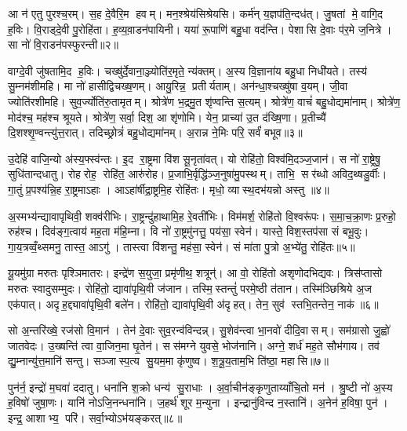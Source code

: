 आ न॑ एतु पुरश्च॒रम्। स॒ह दे॒वैरि॒म हवम्। मन॒श्श्रेय॑सिश्रेयसि। कर्म॑न् य॒ज्ञप॑ति॒न्दध॑त्। जु॒षतां मे॒ वागि॒द ह॒विः। वि॒राड्दे॒वी पु॒रोहि॑ता। ह॒व्य॒वा़डन॑पायिनी। यया॑ रू॒पाणि॑ बहु॒धा वद॑न्ति। पेशासि दे॒वाः प॑र॒मे ज॒नित्रे। सा नो॑ वि॒राडन॑पस्फुरन्ती॥२॥

वाग्दे॒वी जु॑षतामि॒द ह॒विः। चख्षु॑र्दे॒वाना॒ञ्ज्योति॑र॒मृते॒ न्य॑क्तम्। अ॒स्य वि॒ज्ञाना॑य बहु॒धा निधी॑यते। तस्य॑ सु॒म्नम॑शीमहि। मा नो॑ हासीद्विचख्ष॒णम्। आयु॒रिन्न॒ प्रतीर्यताम्। अन॑न्धा॒श्चख्षु॑षा व॒यम्। जी॒वा ज्योति॑रशीमहि। सुव॒र्ज्योति॑रु॒तामृतम्। श्रोत्रे॑ण भ॒द्रमु॒त शृ॑ण्वन्ति स॒त्यम्। श्रोत्रे॑ण॒ वाचं॑ बहु॒धोद्यमा॑नाम्। श्रोत्रे॑ण॒ मोद॑श्च॒ मह॑श्च श्रूयते। श्रोत्रे॑ण॒ सर्वा॒ दिश॒ आ शृ॑णोमि। येन॒ प्राच्या॑ उ॒त द॑ख्षि॒णा। प्र॒तीच्यै॑ दि॒शश्शृ॒ण्वन्त्यु॑त्त॒रात्। तदिच्छ्रोत्रं॑ बहु॒धोद्यमा॑नम्। अ॒रान्न ने॒मिः परि॒ सर्वं॑ बभूव॥३॥\anuvakamend[अ॒ग्रि॒यमन॑पस्फुरन्ती स॒त्य स॒प्त च॑]

उ॒देहि॑ वाजि॒न्यो अ॑स्य॒फ्स्व॑न्तः। इ॒द रा॒ष्ट्रमा वि॑श सू॒नृता॑वत्। यो रोहि॑तो॒ विश्व॑मि॒दञ्ज॒जान॑। स नो॑ रा॒ष्ट्रेषु॒ सुधि॑तान्दधातु। रोहरोह॒ रोहि॑त॒ आरु॑रोह। प्र॒जाभि॒र्वृद्धि॑ञ्ज॒नुषा॑मु॒पस्थम्। ताभि॒ सर॑ब्धो अविद॒थ्षडु॒र्वीः। गा॒तुं प्र॒पश्य॑न्नि॒ह रा॒ष्ट्रमाऽहाः। आऽहा॑र्\mbox{}षीद्रा॒ष्ट्रमि॒ह रोहि॑तः। मृधो॒ व्यास्थ॒दभ॑यन्नो अस्तु ॥४॥

अ॒स्मभ्य॑न्द्यावापृथिवी॒ शक्व॑रीभिः। रा॒ष्ट्रन्दु॑हाथामि॒ह रे॒वती॑भिः। विम॑मर्\mbox{}श॒ रोहि॑तो वि॒श्वरू॑पः। स॒मा॒च॒क्रा॒णः प्र॒रुहो॒ रुह॑श्च। दिव॑ङ्ग॒त्वाय॑ मह॒ता म॑हि॒म्ना। वि नो॑ रा॒ष्ट्रमु॑नत्तु॒ पय॑सा॒ स्वेन॑। यास्ते॒ विश॒स्तप॑सा सं बभू॒वुः। गा॒य॒त्रव्वँ॒थ्समनु॒ तास्त॒ आऽगु॑। तास्त्वा वि॑शन्तु॒ मह॑सा॒ स्वेन॑। सं मा॑ता पु॒त्रो अ॒भ्ये॑तु॒ रोहि॑तः॥५॥

यू॒यमु॑ग्रा मरुतः पृश्ञिमातरः। इन्द्रे॑ण स॒युजा॒ प्रमृ॑णीथ॒ शत्रून्॑। आ वो॒ रोहि॑तो अशृणोदभिद्यवः। त्रिस॑प्तासो मरुतः स्वादुसम्मुदः। रोहि॑तो॒ द्यावा॑पृथि॒वी ज॑जान। तस्मि॒स्तन्तुं॑ परमे॒ष्ठी त॑तान। तस्मि॑ञ्छिश्रिये अ॒ज एक॑पात्। अदृह॒द्द्यावा॑पृथि॒वी बले॑न। रोहि॑तो॒ द्यावा॑पृथि॒वी अ॑दृहत्। तेन॒ सुव॑ स्तभि॒तन्तेन॒ नाक॑॥६॥

सो अ॒न्तरि॑ख्षे॒ रज॑सो वि॒मान॑। तेन॑ दे॒वाः सुव॒रन्व॑विन्दन्न्। सु॒शेव॑न्त्वा भा॒नवो॑ दीदि॒वासम्। सम॑ग्रासो जु॒ह्वो॑ जातवेदः। उ॒ख्षन्ति॑ त्वा वा॒जिन॒मा घृ॒तेन॑। सस॑मग्ने युवसे॒ भोज॑नानि। अग्ने॒ शर्ध॑ मह॒ते सौभ॑गाय। तव॑ द्यु॒म्नान्यु॑त्त॒मानि॑ सन्तु। सञ्जास्प॒त्य सु॒यम॒मा कृ॑णुष्व। श॒त्रू॒य॒ताम॒भि ति॑ष्ठा॒ महासि॥७॥\anuvakamend[अ॒स्त्वे॒तु॒ रोहि॑तो॒ नाको॒ महासि]

पुन॑र्न॒ इन्द्रो॑ म॒घवा॑ ददातु। धना॑नि श॒क्रो धन्य॑ सु॒राधाः। अ॒र्वा॒चीन॑ङ्कृणुताय्याँचि॒तो मन॑। श्रु॒ष्टी नो॑ अ॒स्य ह॒विषो॑ जुषा॒णः। यानि॑ नोऽजि॒नन्धना॑नि। ज॒हर्थ॑ शूर म॒न्युना। इन्द्रानु॑विन्द न॒स्तानि॑। अ॒नेन॑ ह॒विषा॒ पुन॑। इन्द्र॒ आशाभ्य॒ परि॑। सर्वा॒भ्योऽभ॑यङ्करत्॥८॥

